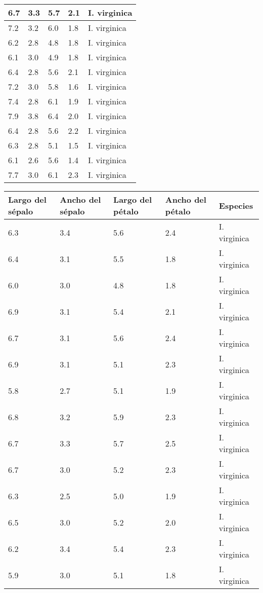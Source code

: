 \begin{appendices}
\begin{center}
\begin{tabular}{|p{2cm}|p{2cm}|p{2cm}|p{2cm}|p{2cm}|}
\hline
6.7	& 3.3 & 5.7	& 2.1 & I. virginica\\
\hline
7.2	& 3.2 & 6.0	& 1.8 & I. virginica\\
\hline
6.2	& 2.8 & 4.8	& 1.8 & I. virginica\\
\hline
6.1	& 3.0 & 4.9	& 1.8 & I. virginica\\
\hline
6.4	& 2.8 & 5.6	& 2.1 & I. virginica\\
\hline
7.2	& 3.0 & 5.8	& 1.6 & I. virginica\\
\hline
7.4	& 2.8 & 6.1	& 1.9 & I. virginica\\
\hline
7.9	& 3.8 & 6.4	& 2.0 & I. virginica\\
\hline
6.4	& 2.8 & 5.6	& 2.2 & I. virginica\\
\hline
6.3	& 2.8 & 5.1	& 1.5 & I. virginica\\
\hline
6.1	& 2.6 & 5.6	& 1.4 & I. virginica\\
\hline
7.7	& 3.0 & 6.1	& 2.3 & I. virginica\\
\hline
\end{tabular}
\end{center}

\begin{center}
\begin{tabular}{|p{2cm}|p{2cm}|p{2cm}|p{2cm}|p{2cm}|}
\hline
Largo del sépalo & Ancho del sépalo & Largo del pétalo & Ancho del pétalo & Especies \\
\hline
6.3	& 3.4 & 5.6	& 2.4 & I. virginica\\
\hline
6.4	& 3.1 & 5.5	& 1.8 & I. virginica\\
\hline
6.0	& 3.0 & 4.8	& 1.8 & I. virginica\\
\hline
6.9	& 3.1 & 5.4	& 2.1 & I. virginica\\
\hline
6.7	& 3.1 & 5.6	& 2.4 & I. virginica\\
\hline
6.9	& 3.1 & 5.1	& 2.3 & I. virginica\\
\hline
5.8	& 2.7 & 5.1	& 1.9 & I. virginica\\
\hline
6.8	& 3.2 & 5.9	& 2.3 & I. virginica\\
\hline
6.7	& 3.3 & 5.7	& 2.5 & I. virginica\\
\hline
6.7	& 3.0 & 5.2	& 2.3 & I. virginica\\
\hline
6.3	& 2.5 & 5.0	& 1.9 & I. virginica\\
\hline
6.5	& 3.0 & 5.2	& 2.0 & I. virginica\\
\hline
6.2	& 3.4 & 5.4	& 2.3 & I. virginica\\
\hline
5.9	& 3.0 & 5.1	& 1.8 & I. virginica\\
\hline
\end{tabular}
\end{center}

\end{appendices}
